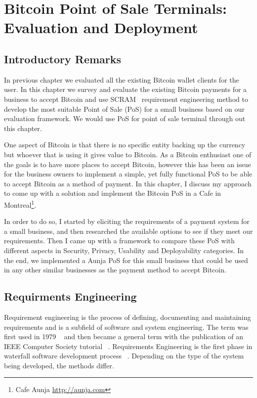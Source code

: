 
\chapter{Bitcoin Point of Sale Terminals: Evaluation and Deployment}


\section{Introductory Remarks}

In previous chapter we evaluated all the existing Bitcoin wallet clients for the user. In this chapter we survey and evaluate the existing Bitcoin payments for a business to accept Bitcoin and use SCRAM~\cite{REScenario}  requirement engineering method to develop the most suitable Point of Sale (PoS) for a small business based on our evaluation framework. We would use PoS for point of sale terminal through out this chapter.

One aspect of Bitcoin is that there is no specific entity backing up the currency but whoever that is using it gives value to Bitcoin. As a Bitcoin enthusiast one of the goals is to have more places to accept Bitcoin, however this has been an issue for the business owners to implement a simple, yet fully functional PoS to be able to accept Bitcoin as a method of payment.
In this chapter, I discuss my approach to come up with a solution and implement the Bitcoin PoS in a Cafe in Montreal\footnote{ Cafe Aunja \url{http://aunja.com}}.

In order to do so, I started by eliciting the requirements of a payment system for a small business, and then researched the available options to see if they meet our requirements. Then I came up with a framework to compare these PoS with different aspects in Security, Privacy, Usability and Deployability categories. In the end, we implemented a Aunja PoS for this small business that could be used in any other similar businesses as the payment method to accept Bitcoin.

\section {Requirments Engineering}
Requirement engineering is the process of defining, documenting and maintaining requirements and is a subfield of software and system engineering. The term was first used in 1979 ~\cite{alford1979software} and then became a general term with the publication of an IEEE Computer Society tutorial ~\cite{dorfman1990system}.
Requirements Engineering is the first phase in waterfall software development process ~\cite{rocye1970managing}. Depending on the type of the system being developed, the methods differ.

